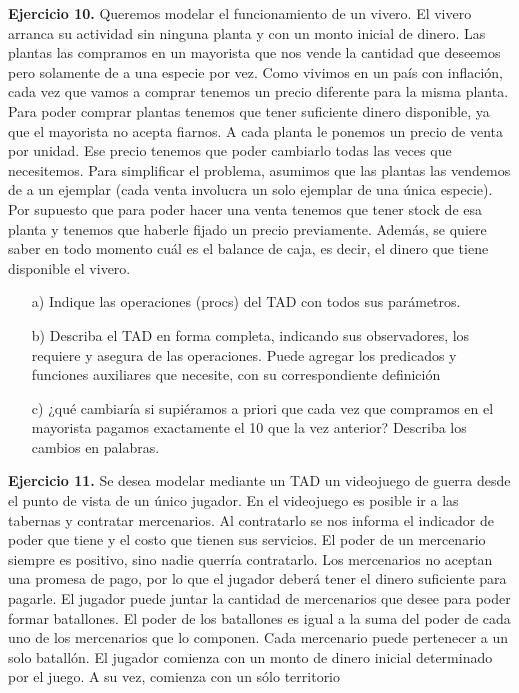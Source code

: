 \documentclass{article}
\begin{document}
\textbf{Ejercicio 10.} Queremos modelar el funcionamiento de un vivero. El vivero arranca su actividad sin ninguna planta y con
un monto inicial de dinero.
Las plantas las compramos en un mayorista que nos vende la cantidad que deseemos pero solamente de a una especie
por vez. Como vivimos en un pa\'is con inflaci\'on, cada vez que vamos a comprar tenemos un precio diferente para la misma
planta. Para poder comprar plantas tenemos que tener suficiente dinero disponible, ya que el mayorista no acepta fiarnos.
A cada planta le ponemos un precio de venta por unidad. Ese precio tenemos que poder cambiarlo todas las veces que
necesitemos. Para simplificar el problema, asumimos que las plantas las vendemos de a un ejemplar (cada venta involucra
un solo ejemplar de una \'unica especie). Por supuesto que para poder hacer una venta tenemos que tener stock de esa planta
y tenemos que haberle fijado un precio previamente. Adem\'as, se quiere saber en todo momento cu\'al es el balance de caja,
es decir, el dinero que tiene disponible el vivero.
\begin{itemize}
    \item[a)] Indique las operaciones (procs) del TAD con todos sus par\'ametros.
    \item[b)] Describa el TAD en forma completa, indicando sus observadores, los requiere y asegura de las operaciones. Puede agregar
    los predicados y funciones auxiliares que necesite, con su correspondiente definici\'on
    \item[c)] ¿qu\'e cambiar\'ia si supi\'eramos a priori que cada vez que compramos en el mayorista pagamos exactamente el 10 %
    que la vez anterior? Describa los cambios en palabras.
\end{itemize}
\textbf{Ejercicio 11.} Se desea modelar mediante un TAD un videojuego de guerra desde el punto de vista de un \'unico jugador.
En el videojuego es posible ir a las tabernas y contratar mercenarios. Al contratarlo se nos informa el indicador de poder
que tiene y el costo que tienen sus servicios. El poder de un mercenario siempre es positivo, sino nadie querr\'ia contratarlo.
Los mercenarios no aceptan una promesa de pago, por lo que el jugador deber\'a tener el dinero suficiente para pagarle. El
jugador puede juntar la cantidad de mercenarios que desee para poder formar batallones. El poder de los batallones es igual
a la suma del poder de cada uno de los mercenarios que lo componen. Cada mercenario puede pertenecer a un solo batall\'on.
El jugador comienza con un monto de dinero inicial determinado por el juego. A su vez, comienza con un s\'olo territorio
\end{document}
